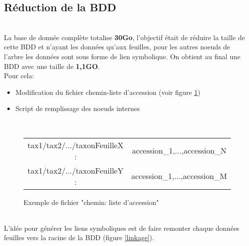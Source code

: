 \subsection{R\'eduction de la BDD}
~\\

La base de donnée complète totalise \textbf{30Go}, l'objectif était de réduire la taille de cette BDD et n'ayant les données qu'aux feuilles, pour les autres noeuds de l'arbre les données sont sous forme de lien symbolique. On obtient au final une BDD avec une taille de \textbf{1,1GO}.
~\\

Pour cela:
\\
\begin{itemize}
 \item Modification du fichier chemin-liste d’accession (voir figure \ref{resultatS})
  \item Script de remplissage des noeuds internes
\end{itemize}
~\\

\begin{figure}[H]
\begin{center}
\begin{tabular}{*{2}{c}}
  tax1/tax2/.../taxonFeuilleX : & accession\_1,...,accession\_N  \\
  tax1/tax2/.../taxonFeuilleY : & accession\_1,...,accession\_M  \\
\end{tabular}
\caption{\label{resultatS} Exemple de fichier "chemin: liste d'accession"}
\end{center}
\end{figure}
~\\

L'idée pour générer les liens symboliques est de faire remonter chaque données feuilles vers la racine de la BDD (figure \ref{linkage}).

\lstset{
	language=C,
	morecomment=[l][keywordstyle]{@\#},
	keywordstyle=\bfseries\ttfamily\color[rgb]{0,0,1},
	identifierstyle=\ttfamily,
	commentstyle=\color[rgb]{0.133,0.545,0.133},
	stringstyle=\ttfamily\color[rgb]{0.627,0.126,0.941},
	showstringspaces=false,
	basicstyle=\small,
	numberstyle=\footnotesize,
	numbers=left,
	stepnumber=1,
	numbersep=8pt,
	tabsize=2,
	breaklines=true,
	prebreak = \raisebox{0ex}[0ex][0ex]{\ensuremath{\hookleftarrow}},
	breakatwhitespace=false,
	aboveskip={1.5\baselineskip},
  columns=fixed,
  upquote=true,
  extendedchars=true,
  frame=single,
}

